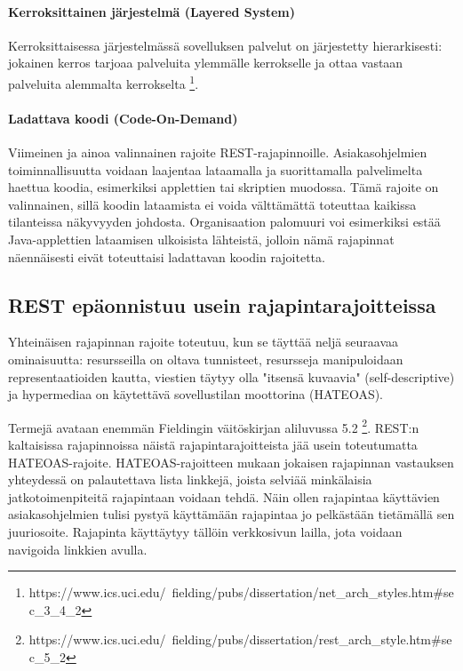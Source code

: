 \paragraph{Kerroksittainen järjestelmä (Layered System)} Kerroksittaisessa järjestelmässä sovelluksen palvelut on järjestetty hierarkisesti: jokainen kerros tarjoaa palveluita ylemmälle kerrokselle ja ottaa vastaan palveluita alemmalta kerrokselta \footnote{https://www.ics.uci.edu/~fielding/pubs/dissertation/net\_arch\_styles.htm\#sec\_3\_4\_2}.

\paragraph{Ladattava koodi (Code-On-Demand)} Viimeinen ja ainoa valinnainen rajoite REST-rajapinnoille. Asiakasohjelmien toiminnallisuutta voidaan laajentaa lataamalla ja suorittamalla palvelimelta haettua koodia, esimerkiksi applettien tai skriptien muodossa. Tämä rajoite on valinnainen, sillä koodin lataamista ei voida välttämättä toteuttaa kaikissa tilanteissa näkyvyyden johdosta. Organisaation palomuuri voi esimerkiksi estää Java-applettien lataamisen ulkoisista lähteistä, jolloin nämä rajapinnat näennäisesti eivät toteuttaisi ladattavan koodin rajoitetta.

\subsection{REST epäonnistuu usein rajapintarajoitteissa}
\label{REST epäonnistuu usein rajapintarajoitteissa}

Yhteinäisen rajapinnan rajoite toteutuu, kun se täyttää neljä seuraavaa ominaisuutta: resursseilla on oltava tunnisteet, resursseja manipuloidaan representaatioiden kautta, viestien täytyy olla "itsensä kuvaavia" (self-descriptive) ja hypermediaa on käytettävä sovellustilan moottorina (HATEOAS). \cite{FieldingRThesisREST}

Termejä avataan enemmän Fieldingin väitöskirjan aliluvussa 5.2 \footnote{https://www.ics.uci.edu/~fielding/pubs/dissertation/rest\_arch\_style.htm\#sec\_5\_2}. REST:n kaltaisissa rajapinnoissa näistä rajapintarajoitteista jää usein toteutumatta HATEOAS-rajoite. HATEOAS-rajoitteen mukaan jokaisen rajapinnan vastauksen yhteydessä on palautettava lista linkkejä, joista selviää minkälaisia jatkotoimenpiteitä rajapintaan voidaan tehdä. Näin ollen rajapintaa käyttävien asiakasohjelmien tulisi pystyä käyttämään rajapintaa jo pelkästään tietämällä sen juuriosoite. Rajapinta käyttäytyy tällöin verkkosivun lailla, jota voidaan navigoida linkkien avulla. \cite{rest-apis-must-be-hypertext-driven}

